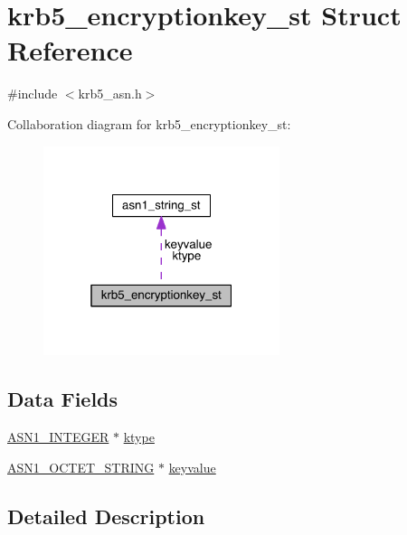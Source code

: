 \hypertarget{structkrb5__encryptionkey__st}{}\section{krb5\+\_\+encryptionkey\+\_\+st Struct Reference}
\label{structkrb5__encryptionkey__st}


{\ttfamily \#include $<$krb5\+\_\+asn.\+h$>$}



Collaboration diagram for krb5\+\_\+encryptionkey\+\_\+st\+:\nopagebreak
\begin{figure}[H]
\begin{center}
\leavevmode
\includegraphics[width=196pt]{structkrb5__encryptionkey__st__coll__graph}
\end{center}
\end{figure}
\subsection*{Data Fields}
\begin{DoxyCompactItemize}
\item 
\hyperlink{crypto_2ossl__typ_8h_af4335399bf9774cb410a5e93de65998b}{A\+S\+N1\+\_\+\+I\+N\+T\+E\+G\+ER} $\ast$ \hyperlink{structkrb5__encryptionkey__st_a837ea9d63a312c9c9f8d14ad750b3cb1}{ktype}
\item 
\hyperlink{crypto_2ossl__typ_8h_afbd05e94e0f0430a2b729473efec88c1}{A\+S\+N1\+\_\+\+O\+C\+T\+E\+T\+\_\+\+S\+T\+R\+I\+NG} $\ast$ \hyperlink{structkrb5__encryptionkey__st_a5b8dbefdad76a2b732c63e130c5c2be8}{keyvalue}
\end{DoxyCompactItemize}


\subsection{Detailed Description}


